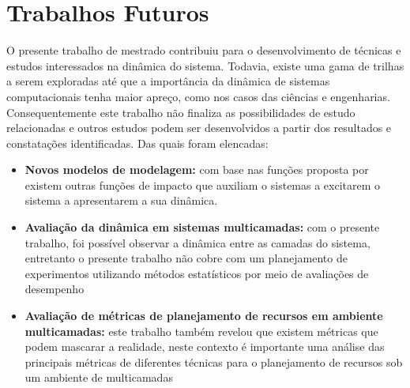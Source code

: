 \section{Trabalhos Futuros}
O presente trabalho de mestrado contribuiu para o desenvolvimento de técnicas e estudos interessados na dinâmica do sistema. Todavia, existe uma gama de trilhas a serem exploradas até que a importância da dinâmica de sistemas computacionais tenha maior apreço, como nos casos das ciências e engenharias. Consequentemente este trabalho não finaliza as possibilidades de estudo relacionadas e outros estudos podem ser desenvolvidos a partir dos resultados e constatações identificadas. Das quais foram elencadas:
\begin{itemize}
	\item \textbf{Novos modelos de modelagem:} com base nas funções proposta por \cite{Hellerstein2004} existem outras funções de impacto que auxiliam o sistemas a excitarem o sistema a apresentarem a sua dinâmica. 
	
	\item \textbf{Avaliação da dinâmica em sistemas multicamadas:} com o presente trabalho, foi possível observar a dinâmica entre as camadas do sistema, entretanto o presente trabalho não cobre com um planejamento de experimentos utilizando métodos estatísticos por meio de avaliações de desempenho
	
	\item \textbf{Avaliação de métricas de planejamento de recursos em ambiente multicamadas:} este trabalho também revelou que existem métricas que podem mascarar a realidade, neste contexto é importante uma análise das principais métricas de diferentes técnicas para o planejamento de recursos sob um ambiente de multicamadas
\end{itemize} 	
